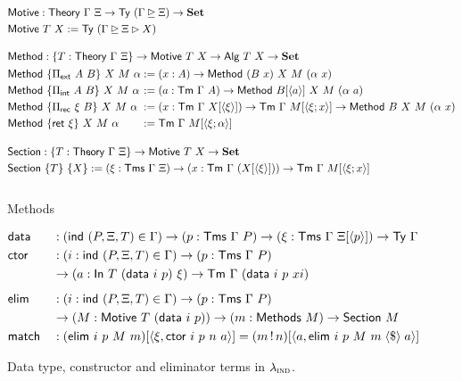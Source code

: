 \newcommand{\Msub}[1]{\langle{#1}\rangle}

\begin{figure}[H]
  \begin{align*}
  &\mta{Motive} : \Theory\ \Gamma\ \Xi \to \Ty\ (\Gamma \unrhd \Xi) \to \Set \\
  &\mta{Motive}\ T\ X := \Ty\ (\Gamma \unrhd \Xi \rhd X) \\[1em]
  &\mta{Method} : \{T : \Theory\ \Gamma\ \Xi\} \to \mta{Motive}\ T\ X \to \mta{Alg}\ T\ X \to \Set \\
  &\begin{alignedat}{2}
  &\mta{Method}\ \{\Pi_{\mta{ext}}\ A\ B\}\ X\ M\ \alpha &&:= (x : A) \to \mta{Method}\ (B\ x)\ X\ M\ (\alpha\ x) \\
  &\mta{Method}\ \{\Pi_{\mta{int}}\ A\ B\}\ X\ M\ \alpha &&:= (a : \Tm\ \Gamma\ A) \to \mta{Method}\ B [\langle a \rangle]\ X\ M\ (\alpha\ a) \\
  &\mta{Method}\ \{\Pi_{\mta{rec}}\ \xi\ B\}\ X\ M\ \alpha &&:= (x : \Tm\ \Gamma\ X [\langle \xi \rangle]) \to \Tm\ \Gamma\ M [\langle \xi ; x \rangle] \to \mta{Method}\ B\ X\ M\ (\alpha\ x) \\
  &\mta{Method}\ \{\mta{ret}\ \xi\}\ X\ M\ \alpha &&:= \Tm\ \Gamma\ M [\langle \xi ; \alpha \rangle] 
  \end{alignedat} \\[1em]
  &\mta{Section} : \{T : \Theory\ \Gamma\ \Xi\} \to \mta{Motive}\ T\ X \to \Set \\
  &\mta{Section}\ \{T\}\ \{X\} := (\xi : \Tms\ \Gamma\ \Xi) \to (x : \Tm\ \Gamma\ (X[\Msub \xi])) \to \Tm\ \Gamma\ M[\Msub {\xi; x}] \\[1em]
  \end{align*}
  \caption{Methods}
  \label{fig:lambdaind-motive-methods}
\end{figure}

\newcommand{\fmap}{\;\langle\$\rangle\;}

\begin{figure}[H]
  \begin{alignat*}{2}
  & \mta{data} &&: (\mta{ind}\ (P, \Xi, T) \in \Gamma) \to (p : \Tms\ \Gamma\ P) \to (\xi : \Tms\ \Gamma\ \Xi[\langle p \rangle]) \to \Ty\ \Gamma \\ 
  & \mta{ctor} &&: (i : \mta{ind}\ (P, \Xi, T) \in \Gamma) \to (p : \Tms\ \Gamma\ P) \\
  &            && \to (a : \mta{In}\ T\ (\mta{data}\ i\ p)\ \xi) \to \Tm\ \Gamma\ (\mta{data}\ i\ p\ xi) \\[0.5em]
  & \mta{elim} &&: (i : \mta{ind}\ (P, \Xi, T) \in \Gamma) \to (p : \Tms\ \Gamma\ P) \\ 
  &            && \to (M : \mta{Motive}\ T\ (\mta{data}\ i\ p)) \to (m : \mta{Methods}\ M) \to \mta{Section}\ M \\
  & \mta{match} &&: (\mta{elim}\ i\ p\ M\ m)[\langle \xi, \mta{ctor}\ i\ p\ n\ a \rangle] = (m\,!\,n)[\langle a , \mta{elim}\ i\ p\ M\ m \fmap a \rangle]
  \end{alignat*}
  \caption{Data type, constructor and eliminator terms in $\lambda_{\textsc{ind}}$.}
  \label{fig:lambdaind-data-ctor}
\end{figure}

